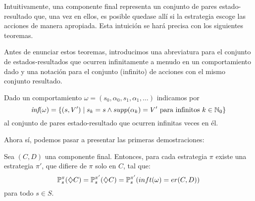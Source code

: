 Intuitivamente, una componente final representa un conjunto de pares
estado-resultado que, una vez en ellos, es posible quedase allí si la
estrategia escoge las acciones de manera apropiada. Esta intuición se hará
precisa con los siguientes teoremas.

Antes de enunciar estos teoremas, introducimos una abreviatura para el conjunto
de estados-resultados que ocurren infinitamente a menudo en un comportamiento
dado y una notación para el conjunto (infinito) de acciones con el mismo
conjunto resultado.

\begin{definition}[$\inft$]
	Dado un comportamiento $\omega = (s_0, \alpha_0, s_1, \alpha_1, \dots)$ indicamos por
	\[
		\textit{inf} (\omega) = \{(s, V') \mid s_k = s \wedge supp(\alpha_k) = V' \text{ para infinitos } k \in \mathbb{N}_0\}
	\]
	al conjunto de pares estado-resultado que ocurren infinitas veces en él.
\end{definition}

Ahora sí, podemos pasar a presentar las primeras demostraciones:

\begin{theorem}
	\label{teoEstabilidadEC}
	Sea $(C, D)$ una componente final. Entonces, para cada estrategia $\pi$ existe una estrategia $\pi'$, que difiere de $\pi$ solo en $C$, tal que:
	\begin{equation} \label{estabEC}
		\mathbb{P}^\pi_s(\diamondsuit C) = \mathbb{P}^{\pi'}_s(\diamondsuit C) = \mathbb{P}^{\pi'}_s(inft(\omega) = er(C,D))
	\end{equation}
	para todo $s \in S$.
\end{theorem}

